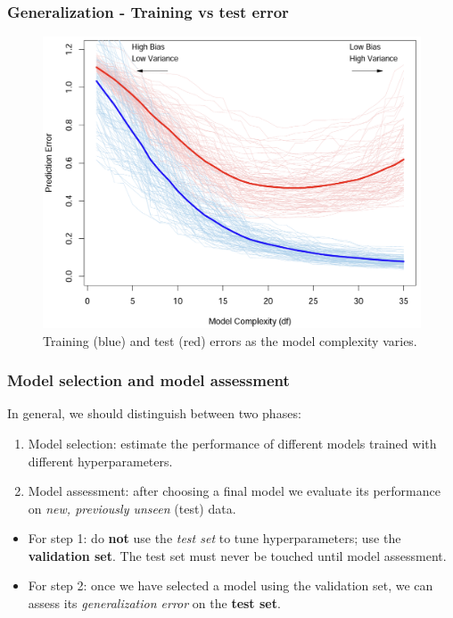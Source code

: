 \documentclass{beamer}
\begin{document}
	\begin{frame}
	\frametitle{Generalization - Training vs test error}
	\begin{figure}
		\centering
		\includegraphics[scale=0.8]{images/model_selection_general_idea}
		\caption{Training (blue) and test (red) errors as the model complexity varies.}
	\end{figure}
\end{frame}

	

	\begin{frame}
		\frametitle{Model selection and model assessment}
		
		In general, we should distinguish between two phases:
		\begin{enumerate}
			\item Model selection: estimate the performance of different models trained with different hyperparameters. 
			\item Model assessment: after choosing a final model we evaluate its performance on \textsl{new, previously unseen} (test) data.
		\end{enumerate}
		
		\vspace{5mm}
		
		\begin{itemize}
			\item For step 1: do \textbf{not} use the \textit{test set} to tune hyperparameters; use the \textbf{validation set}. The test set must never be touched until model assessment.
			\item For step 2: once we have selected a model using the validation set, we can assess its \textit{generalization error} on the \textbf{test set}. %
		\end{itemize}
		
	\end{frame}
\end{document}
